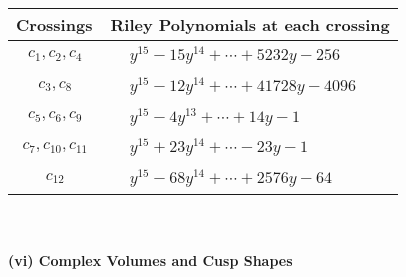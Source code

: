 \documentclass[1p]{elsarticle_modified}
\theoremstyle{definition}
\begin{document}
\begin{tabular}{m{50pt}|m{274pt}}
Crossings & \hspace{64pt}Riley Polynomials at each crossing \\
\hline $$\begin{aligned}c_{1},c_{2},c_{4}\end{aligned}$$&$\begin{aligned}
&y^{15}-15 y^{14}+\cdots+5232 y-256
\end{aligned}$\\
\hline $$\begin{aligned}c_{3},c_{8}\end{aligned}$$&$\begin{aligned}
&y^{15}-12 y^{14}+\cdots+41728 y-4096
\end{aligned}$\\
\hline $$\begin{aligned}c_{5},c_{6},c_{9}\end{aligned}$$&$\begin{aligned}
&y^{15}-4 y^{13}+\cdots+14 y-1
\end{aligned}$\\
\hline $$\begin{aligned}c_{7},c_{10},c_{11}\end{aligned}$$&$\begin{aligned}
&y^{15}+23 y^{14}+\cdots-23 y-1
\end{aligned}$\\
\hline $$\begin{aligned}c_{12}\end{aligned}$$&$\begin{aligned}
&y^{15}-68 y^{14}+\cdots+2576 y-64
\end{aligned}$\\
\hline
\end{tabular}\\~\\
\newpage\flushleft \textbf{(vi) Complex Volumes and Cusp Shapes}
\end{document}
